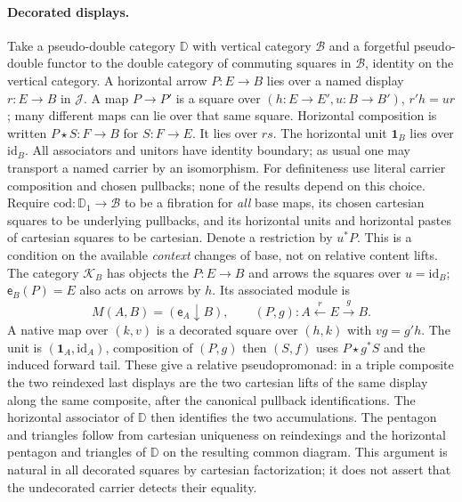 \documentclass[11pt]{article}
\theoremstyle{definition}\newtheorem{definition}[theorem]{Definition}
\newcommand{\B}{\mathcal B}\newcommand{\J}{\mathcal J}
\newcommand{\D}{\mathbb D}\newcommand{\N}{\mathbb N}
\newcommand{\K}{\mathcal K}\newcommand{\Lcat}{\mathcal L}
\newcommand{\id}{\mathrm{id}}\newcommand{\op}{\mathrm{op}}\newcommand{\dom}{\mathrm{dom}}
\newcommand{\cod}{\mathrm{cod}}\newcommand{\iso}{\xrightarrow{\ \sim\ }}
\newcommand{\ea}{\mathsf e}\newcommand{\un}{\mathbf1}\newcommand{\Tt}{\overline T}
\newcommand{\st}{\mathbin{\star}}\newcommand{\bx}{\mathop{\boxtimes}}
\begin{document}
\paragraph{Decorated displays.}
Take a pseudo-double category $\D$ with vertical category $\B$ and a
forgetful pseudo-double functor to the double category of commuting
squares in $\B$, identity on the vertical category. A horizontal arrow
$P:E\to B$ lies over a named display $r:E\to B$ in $\J$. A map
$P\to P'$ is a square over $(h:E\to E',u:B\to B')$, $r'h=ur$;
many different maps can lie over that same square. Horizontal composition
is written $P\st S:F\to B$ for $S:F\to E$. It lies over $rs$.
The horizontal unit $\un_B$ lies over $\id_B$. All associators and
unitors have identity boundary; as usual one may transport a named
carrier by an isomorphism. For definiteness use literal carrier
composition and chosen pullbacks; none of the results depend on this
choice.
Require $\cod:\D_1\to\B$ to be a fibration for \emph{all}
base maps, its chosen cartesian squares to be underlying pullbacks,
and its horizontal units and horizontal pastes of cartesian squares
to be cartesian. Denote a restriction by $u^*P$. This is a condition on
the available \emph{context} changes of base, not on relative content
lifts. The category $\K_B$ has objects the $P:E\to B$ and arrows the
squares over $u=\id_B$; $\ea_B(P)=E$ also acts on arrows by $h$.
Its associated module is
\[
 M(A,B)=(\ea_A\downarrow B),\qquad
 (P,g): A\xleftarrow{r} E\xrightarrow{g} B.
\]
A native map over $(k,v)$ is a decorated square over $(h,k)$ with
$vg=g'h$. The unit is $(\un_A,\id_A)$, composition of $(P,g)$
then $(S,f)$ uses $P\st g^*S$ and the induced forward tail.
These give a relative pseudopromonad: in a triple composite the
two reindexed last displays are the two cartesian lifts of the same
display along the same composite, after the canonical pullback
identifications. The horizontal associator of $\D$ then identifies the
two accumulations. The pentagon and triangles follow from cartesian
uniqueness on reindexings and the horizontal pentagon and triangles
of $\D$ on the resulting common diagram. This argument is natural in
all decorated squares by cartesian factorization; it does not assert
that the undecorated carrier detects their equality.
\end{document}
